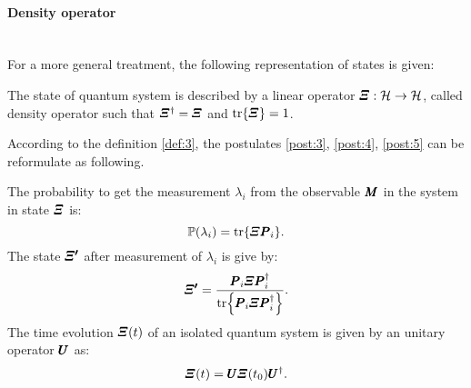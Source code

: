     \paragraph{Density operator}\mbox{}\\
        For a more general treatment, the following representation of states is given:
        \begin{definition}
            The state of quantum system is described by a linear operator $\Operator{\varXi}:\Hilbert\to\Hilbert$, 
            called density operator such that 
            $\Operator{\varXi}^\dagger=\Operator{\varXi}$ and $\tr{\Operator{\varXi}}=1$.
            \label{def:3}
        \end{definition}
        According to the definition \ref{def:3}, the postulates \ref{post:3}, \ref{post:4},
        \ref{post:5} can be reformulate as following.\par
        The probability to get the measurement $\lambda_i$ from the observable 
        $\Operator{M}$ in the system in state $\Operator{\varXi}$ is:
        \begin{equation}
            \mathbb{P}(\lambda_i)=\tr{\Operator{\varXi}\Operator{P}_i}.
            \label{post:3.1}
        \end{equation}
        The state $\Operator{\varXi'}$ after measurement of $\lambda_i$ is give by:
        \begin{equation}
            \Operator{\varXi'}=\frac{\Operator{P}_i\Operator{\varXi}\Operator{P}_i^\dagger}
            {\tr{\Operator{P}_i\Operator{\varXi}\Operator{P}_i^\dagger}}.
            \label{post:4.1}
        \end{equation}
        The time evolution $\Operator{\varXi}(t)$ of an isolated quantum system is given by an unitary operator
        $\Operator{U}$ as:
        \begin{equation}
            \Operator{\varXi}(t)=\Operator{U}\Operator{\varXi}(t_0)\Operator{U}^\dagger.
            \label{post:5.1}
        \end{equation}